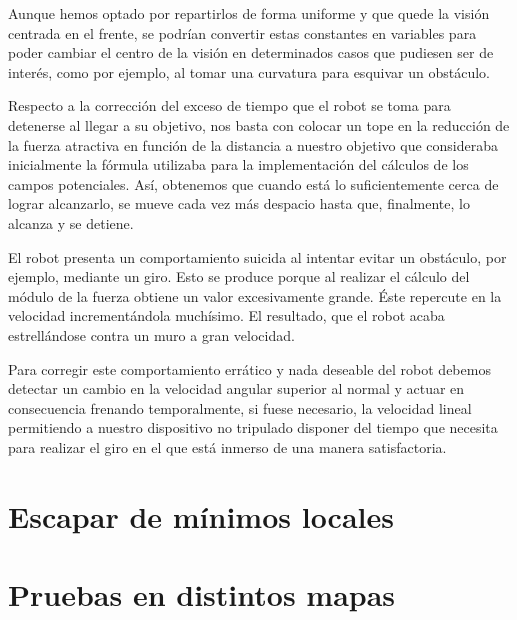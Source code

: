 \documentclass[a4paper, 11pt]{article}
\begin{document}
	Aunque hemos optado por repartirlos de forma uniforme y que quede la visión centrada en el frente,
	se podrían convertir estas constantes en variables para poder cambiar el centro de la visión en
	determinados casos que pudiesen ser de interés, como por ejemplo, al tomar una curvatura para esquivar
	un obstáculo.

	Respecto a la corrección del exceso de tiempo que el robot se toma para detenerse al llegar a su
	objetivo, nos basta con colocar un tope en la reducción de la fuerza atractiva en función de la
	distancia a nuestro objetivo que consideraba inicialmente la fórmula utilizaba para la implementación
	del cálculos de los campos potenciales. Así, obtenemos que cuando está lo suficientemente cerca de
	lograr alcanzarlo, se mueve cada vez más despacio hasta que, finalmente, lo alcanza y se detiene.
	
	El robot presenta un comportamiento suicida al intentar evitar un obstáculo, por ejemplo, mediante
	un giro. Esto se produce porque al realizar el cálculo del módulo de la fuerza obtiene un valor
	excesivamente grande. Éste repercute en la velocidad incrementándola muchísimo. El resultado, que
	el robot acaba estrellándose contra un muro a gran velocidad.
	
	Para corregir este comportamiento errático y nada deseable del robot debemos detectar un cambio en
	la velocidad angular superior al normal y actuar en consecuencia frenando temporalmente, si fuese
	necesario, la velocidad lineal permitiendo a nuestro dispositivo no tripulado disponer del tiempo
	que necesita para realizar el giro en el que está inmerso de una manera satisfactoria.
	
\section{Escapar de mínimos locales}

\section{Pruebas en distintos mapas}
	
\end{document}
